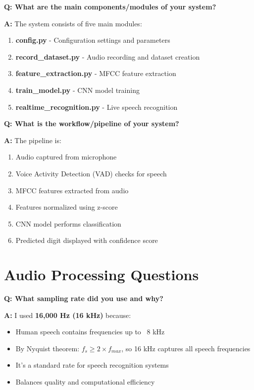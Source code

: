 \documentclass[a4paper,12pt]{article}
\newcommand{\vivaQ}[1]{\textcolor{questioncolor}{\textbf{Q: #1}}}
\newcommand{\vivaA}[1]{\textcolor{answercolor}{\textbf{A:}} #1}
\begin{document}
\vspace{0.5cm}

\vivaQ{What are the main components/modules of your system?}

\vivaA{The system consists of five main modules:
\begin{enumerate}
    \item \textbf{config.py} - Configuration settings and parameters
    \item \textbf{record\_dataset.py} - Audio recording and dataset creation
    \item \textbf{feature\_extraction.py} - MFCC feature extraction
    \item \textbf{train\_model.py} - CNN model training
    \item \textbf{realtime\_recognition.py} - Live speech recognition
\end{enumerate}}

\vspace{0.5cm}

\vivaQ{What is the workflow/pipeline of your system?}

\vivaA{The pipeline is:
\begin{enumerate}
    \item Audio captured from microphone
    \item Voice Activity Detection (VAD) checks for speech
    \item MFCC features extracted from audio
    \item Features normalized using z-score
    \item CNN model performs classification
    \item Predicted digit displayed with confidence score
\end{enumerate}}

\section{Audio Processing Questions}

\vivaQ{What sampling rate did you use and why?}

\vivaA{I used \textbf{16,000 Hz (16 kHz)} because:
\begin{itemize}
    \item Human speech contains frequencies up to ~8 kHz
    \item By Nyquist theorem: $f_s \geq 2 \times f_{max}$, so 16 kHz captures all speech frequencies
    \item It's a standard rate for speech recognition systems
    \item Balances quality and computational efficiency
\end{itemize}}
\end{document}
